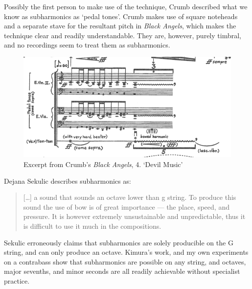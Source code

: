   Possibly the first person to make use of the technique, Crumb described what we know as subharmonics as `pedal tones'.\autocite{crumbBlackAngelsImages1971}
  Crumb makes use of square noteheads and a separate stave for the resultant pitch in \emph{Black Angels}, which makes the technique clear and readily understandable.\autocite[]{crumbBlackAngels1995}
  They are, however, purely timbral, and no recordings seem to treat them as subharmonics.
  
  \begin{figure}
    \includegraphics[width=\linewidth]{./resources/crumbBlackAngels.png}
    \caption{Excerpt from Crumb's \emph{Black Angels}, 4. `Devil Music'}\label{fig:Excerpt from Crumb's Black Angels}\end{figure}

Dejana Sekulic describes subharmonics as:

\begin{quotation}
  [\ldots] a sound that sounds an octave lower than g string. 
  To produce this sound the use of bow is of great importance --- the place, speed, and pressure. 
It is however extremely unsustainable and unpredictable, thus it is difficult to use it much in the compositions.\autocite[15]{sekulicYouHearMe2012}\end{quotation}

Sekulic erroneously claims that subharmonics are solely producible on the G string, and can only produce an octave. 
Kimura's work, and my own experiments on a contrabass show that subharmonics are possible on any string, and octaves, major sevenths, and minor seconds are all readily achievable without specialist practice.\autocite[]{kimuraHowProduceSubharmonics1999}



